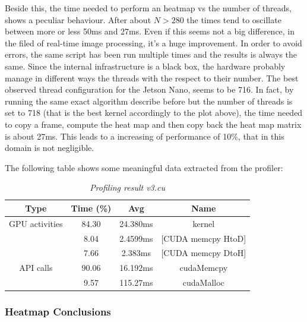 \documentclass[paper=a4, fontsize=10pt]{scrartcl}	%
\begin{document}
	Beside this, the time needed to perform an heatmap vs the number of threads, shows a peculiar behaviour. After about $N > 280$ the times tend to oscillate between more or less 50ms and 27ms. Even if this seems not a big difference, in the filed of real-time image processing, it's a huge improvement. In order to avoid errors, the same script has been run multiple times and the results is always the same. Since the internal infrastructure is a black box, the hardware probably manage in different ways the threads with the respect to their number.\newline
	The best observed thread configuration for the Jetson Nano, seems to be 716.\newline\newline
	In fact, by running the same exact algorithm describe before but the number of threads is set to 718 (that is the best kernel accordingly to the plot above), the time needed to copy a frame, compute the heat map and then copy back the heat map matrix is about 27ms. This leads to a increasing of performance of 10\%, that in this domain is not negligible.
	
	The following table shows some meaningful data extracted from the profiler:
		\begin{table}[H]
		\centering
		\begin{center}
			\begin{tabular}{ |c|c|c|c| } 
				\hline
				\textbf{Type} & \textbf{Time} (\%) & \textbf{Avg} & \textbf{Name} \\ 
				\hline
				GPU activities & 84.30 & 24.380ms & kernel \\ 
				& 8.04 & 2.4599ms & [CUDA memcpy HtoD] \\ 
				& 7.66 & 2.383ms & [CUDA memcpy DtoH] \\ 
				\hline
				API calls & 90.06 & 16.192ms & cudaMemcpy \\ 
				& 9.57 & 115.27ms & cudaMalloc \\ 
				\hline
			\end{tabular}
		\end{center}
		\label{fig:table_v4}
		\caption{\textit{Profiling result v3.cu}}
	\end{table}

	\subsubsection{Heatmap Conclusions}
\end{document}
